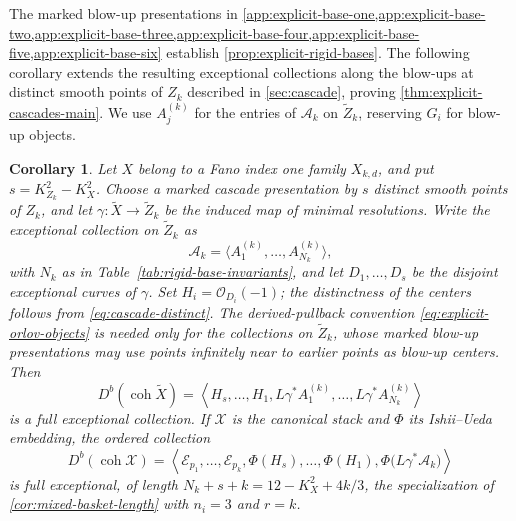 \documentclass[11pt]{article}
\theoremstyle{plain}
\newtheorem{corollary}[corollary]{Corollary}
\theoremstyle{definition}
\theoremstyle{remark}
\newcommand{\Db}{D^b}
\newcommand{\coh}{\operatorname{coh}}
\newcommand{\XX}{\mathcal X}
\newcommand{\OO}{\mathcal O}
\begin{document}
The marked blow-up presentations in
\cref{app:explicit-base-one,app:explicit-base-two,app:explicit-base-three,app:explicit-base-four,app:explicit-base-five,app:explicit-base-six}
establish \cref{prop:explicit-rigid-bases}. The following corollary extends
the resulting exceptional collections along the blow-ups at distinct smooth
points of \(Z_k\) described in \cref{sec:cascade}, proving
\cref{thm:explicit-cascades-main}. We use \(A^{(k)}_j\) for the entries
of \(\mathscr A_k\) on \(\widetilde Z_k\), reserving \(G_i\) for
blow-up objects.

\begin{corollary}\label{cor:explicit-cascade-collections}
Let \(X\) belong to a Fano index one family \(X_{k,d}\), and put
\(s=K_{Z_k}^2-K_X^2\). Choose a marked cascade presentation by
\(s\) distinct smooth points of \(Z_k\), and let
\(\gamma:\widetilde X\to\widetilde Z_k\) be the induced map of
minimal resolutions. Write the exceptional collection on \(\widetilde Z_k\) as
\[
\mathscr A_k=\langle A^{(k)}_1,\ldots,A^{(k)}_{N_k}\rangle,
\]
with \(N_k\) as in Table~\ref{tab:rigid-base-invariants}, and let \(D_1,\ldots,D_s\) be the disjoint exceptional curves of
\(\gamma\). Set \(H_i=\OO_{D_i}(-1)\); the distinctness of the centers follows
from \eqref{eq:cascade-distinct}. The derived-pullback convention
\eqref{eq:explicit-orlov-objects} is needed only for the collections on
\(\widetilde Z_k\), whose marked blow-up presentations may use points
infinitely near to earlier points as blow-up centers. Then
\[
\Db(\coh\widetilde X)=
\left\langle H_s,\ldots,H_1,
L\gamma^*A^{(k)}_1,\ldots,L\gamma^*A^{(k)}_{N_k}\right\rangle
\]
is a full exceptional collection. If \(\XX\) is the canonical stack
and \(\Phi\) its Ishii--Ueda embedding, the ordered collection
\[
\Db(\coh\XX)=\left\langle
\mathcal E_{p_1},\ldots,\mathcal E_{p_k},
\Phi(H_s),\ldots,\Phi(H_1),
\Phi\bigl(L\gamma^*\mathscr A_k\bigr)
\right\rangle
\]
is full exceptional, of length
\(N_k+s+k=12-K_X^2+4k/3\), the specialization of
\cref{cor:mixed-basket-length} with \(n_i=3\) and \(r=k\).
\end{corollary}
\end{document}
